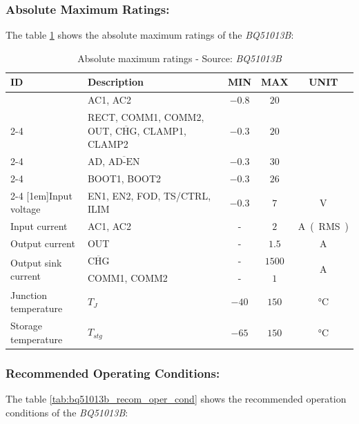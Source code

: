 \documentclass[report.tex]{subfiles}
\begin{document}
\subsubsection{Absolute Maximum Ratings:}

The table \ref{tab:bq51013b_absolute_max_rating} shows the absolute maximum ratings of the \textit{BQ51013B}:

\begin{table}[H]
\centering
\setlength{\extrarowheight}{2pt}
\begin{tabularx}{\textwidth}{|X|X|c|c|c|}
\hline
\textbf{ID} & \textbf{Description} & \textbf{MIN} & \textbf{MAX} & \textbf{UNIT} \\\hline
& AC1, AC2 & $-0.8$ & $20$ &  \\\cline{2-4}
& RECT, COMM1, COMM2, OUT, $\overline{\text{CHG}}$, CLAMP1, CLAMP2 & $-0.3$ & $20$ & \\\cline{2-4}
& AD, $\overline{\text{AD-EN}}$ & $-0.3$ & $30$ & \\\cline{2-4}
& BOOT1, BOOT2 & $-0.3$ & $26$ & \\\cline{2-4}
\multirow{-5}{*}[1em]{Input voltage}& EN1, EN2, FOD, TS/CTRL, ILIM & $-0.3$ & $7$ & \multirow{-5}{*}[1em]{\si{\volt}} \\\hline
Input current & AC1, AC2 & - & $2$ & \si{\ampere(RMS)} \\\hline
Output current & OUT & - & $1.5$ & \si{\ampere} \\\hline
\multirow{2}{*}{Output sink current} & $\overline{\text{CHG}}$ & - & $1500$ &  \multirow{2}{*}{\si{\ampere}}\\\cline{2-4}
 & COMM1, COMM2 & - & $1$ & \\\hline
Junction temperature & $T_{J}$ & $-40$ & $150$ & \si{\celsius} \\\hline
Storage temperature & $T_{stg}$ & $-65$ & $150$ & \si{\celsius} \\\hline
\end{tabularx}
\caption{Absolute maximum ratings - Source: \textit{BQ51013B}\cite{BQ51013B}}
\label{tab:bq51013b_absolute_max_rating}
\end{table}

\subsubsection{Recommended Operating Conditions:}

The table \ref{tab:bq51013b_recom_oper_cond} shows the recommended operation conditions of the \textit{BQ51013B}:
\end{document}
